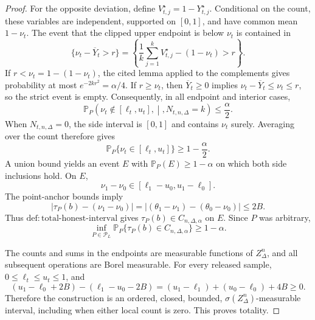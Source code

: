 \documentclass{article}
\begin{document}
\begin{proof}
For the opposite deviation, define \(V_{t,j}^{\star}=1-Y_{t,j}^{\star}\).  Conditional on the count, these variables are independent, supported on \([0,1]\), and have common mean \(1-\nu_t\).  The event that the clipped upper endpoint is below \(\nu_t\) is contained in
\[
 \{\nu_t-\overline Y_t>r\}
 =\left\{\frac1k\sum_{j=1}^kV_{t,j}^{\star}-(1-\nu_t)>r\right\}.
\]
If \(r<\nu_t=1-(1-\nu_t)\), the cited lemma applied to the complements gives probability at most \(e^{-2kr^2}=\alpha/4\).  If \(r\geq\nu_t\), then \(\overline Y_t\geq0\) implies \(\nu_t-\overline Y_t\leq\nu_t\leq r\), so the strict event is empty.  Consequently, in all endpoint and interior cases,
\[
 \mathbb P_P\!\left(\nu_t\notin[\ell_t,u_t],\middle|,N_{t,n,\Delta}=k\right)
 \leq\frac\alpha2.
\]
When \(N_{t,n,\Delta}=0\), the side interval is \([0,1]\) and contains \(\nu_t\) surely.  Averaging over the count therefore gives
\[
 \mathbb P_P\{\nu_t\in[\ell_t,u_t]\}\geq1-\frac\alpha2.
\]
A union bound yields an event \(E\) with \(\mathbb P_P(E)\geq1-\alpha\) on which both side inclusions hold.  On \(E\),
\[
 \nu_1-\nu_0\in[\ell_1-u_0,u_1-\ell_0].
\]
The point-anchor bounds imply
\[
 |\tau_P(b)-(\nu_1-\nu_0)|
 =| (\theta_1-\nu_1)-(\theta_0-\nu_0)|
 \leq2B.
\]
Thus \(\mathrm{def:total\text{-}honest\text{-}interval}\) gives \(\tau_P(b)\in C_{n,\Delta,\alpha}\) on \(E\).  Since \(P\) was arbitrary,
\[
 \inf_{P\in\mathcal P_L}\mathbb P_P\{\tau_P(b)\in C_{n,\Delta,\alpha}\}\geq1-\alpha.
\]

The counts and sums in the endpoints are measurable functions of \(Z_\Delta^n\), and all subsequent operations are Borel measurable.  For every released sample, \(0\leq\ell_t\leq u_t\leq1\), and
\[
 (u_1-\ell_0+2B)-(\ell_1-u_0-2B)
 =(u_1-\ell_1)+(u_0-\ell_0)+4B\geq0.
\]
Therefore the construction is an ordered, closed, bounded, \(\sigma(Z_\Delta^n)\)-measurable interval, including when either local count is zero.  This proves totality.


\end{proof}
\end{document}
